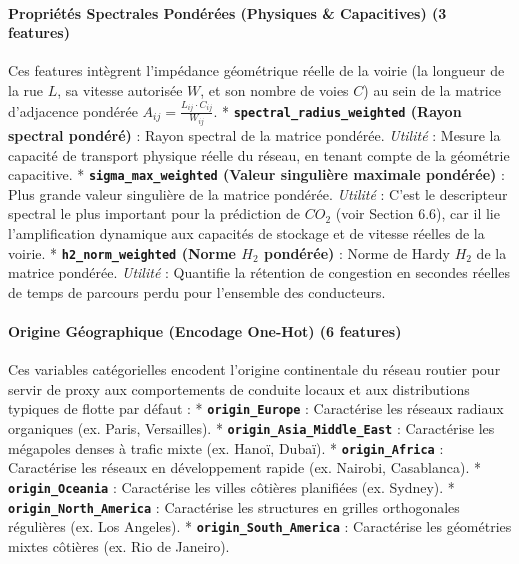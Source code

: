 \documentclass[10pt, a4paper]{article}
\begin{document}
\paragraph{Propriétés Spectrales Pondérées (Physiques \& Capacitives) (3
features)}\label{propriuxe9tuxe9s-spectrales-ponduxe9ruxe9es-physiques-capacitives-3-features}

Ces features intègrent l'impédance géométrique réelle de la voirie (la
longueur de la rue \(L\), sa vitesse autorisée \(W\), et son nombre de
voies \(C\)) au sein de la matrice d'adjacence pondérée
\(A_{ij} = \frac{L_{ij} \cdot C_{ij}}{W_{ij}}\). *
\textbf{\texttt{spectral\_radius\_weighted} (Rayon spectral pondéré)} :
Rayon spectral de la matrice pondérée. \emph{Utilité} : Mesure la
capacité de transport physique réelle du réseau, en tenant compte de la
géométrie capacitive. * \textbf{\texttt{sigma\_max\_weighted} (Valeur
singulière maximale pondérée)} : Plus grande valeur singulière de la
matrice pondérée. \emph{Utilité} : C'est le descripteur spectral le plus
important pour la prédiction de \(CO_2\) (voir Section 6.6), car il lie
l'amplification dynamique aux capacités de stockage et de vitesse
réelles de la voirie. * \textbf{\texttt{h2\_norm\_weighted} (Norme
\(H_2\) pondérée)} : Norme de Hardy \(H_2\) de la matrice pondérée.
\emph{Utilité} : Quantifie la rétention de congestion en secondes
réelles de temps de parcours perdu pour l'ensemble des conducteurs.

\paragraph{Origine Géographique (Encodage One-Hot) (6
features)}\label{origine-guxe9ographique-encodage-one-hot-6-features}

Ces variables catégorielles encodent l'origine continentale du réseau
routier pour servir de proxy aux comportements de conduite locaux et aux
distributions typiques de flotte par défaut : *
\textbf{\texttt{origin\_Europe}} : Caractérise les réseaux radiaux
organiques (ex. Paris, Versailles). *
\textbf{\texttt{origin\_Asia\_Middle\_East}} : Caractérise les mégapoles
denses à trafic mixte (ex. Hanoï, Dubaï). *
\textbf{\texttt{origin\_Africa}} : Caractérise les réseaux en
développement rapide (ex. Nairobi, Casablanca). *
\textbf{\texttt{origin\_Oceania}} : Caractérise les villes côtières
planifiées (ex. Sydney). * \textbf{\texttt{origin\_North\_America}} :
Caractérise les structures en grilles orthogonales régulières (ex. Los
Angeles). * \textbf{\texttt{origin\_South\_America}} : Caractérise les
géométries mixtes côtières (ex. Rio de Janeiro).
\end{document}

